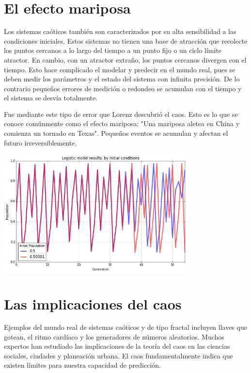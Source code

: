 \documentclass{article} %
\begin{document}
\section*{El efecto mariposa}

Los sistemas caóticos también son caracterizados por su alta sensibilidad a las condiciones iniciales. Estos sistemas no tienen una base de atracción que recolecte los puntos cercanos a lo largo del tiempo a un punto fijo o un ciclo límite atractor. En cambio, con un atractor extraño, los puntos cercanos divergen con el tiempo. Esto hace complicado el modelar y predecir en el mundo real, pues se deben medir los parámetros y el estado del sistema con infinita precisión. De lo contrario pequeños errores de medición o redondeo se acumulan con el tiempo y el sistema se desvía totalmente. 

\vspace{0.5 cm}

Fue mediante este tipo de error que Lorenz descubrió el caos. Esto es lo que se conoce comúnmente como el efecto mariposa: "Una mariposa aletea en China y comienza un tornado en Texas". Pequeños eventos se acumulan y afectan el futuro irreversiblemente.

\begin{center}

	\includegraphics[width=10cm]{mariposa.png}
    
\end{center}

\section*{Las implicaciones del caos}

Ejemplos del mundo real de sistemas caóticos y de tipo fractal incluyen llaves que gotean, el ritmo cardíaco y los generadores de números aleatorios. Muchos expertos han estudiado las implicaciones de la teoría del caos en las ciencias sociales, ciudades y planeación urbana. El caos fundamentalmente indica que existen límites para nuestra capacidad de predicción.          
\end{document}
